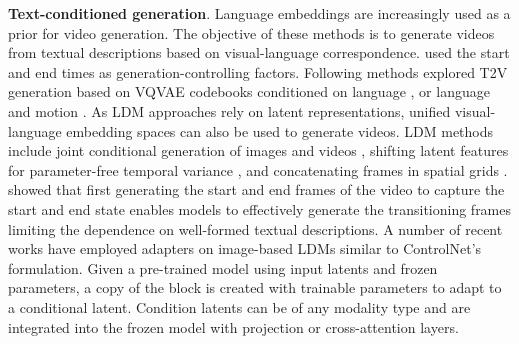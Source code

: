 






\noindent
\textbf{Text-conditioned generation}. Language embeddings are increasingly used as a prior for video generation. The objective of these methods is to generate videos from textual descriptions based on visual-language correspondence. \citet{dorkenwald2021stochastic} used the start and end times as generation-controlling factors. 
Following methods explored T2V generation based on VQVAE codebooks conditioned on language \citep{han2022show,yan2021videogpt}, or language and motion \citep{hu2022make}. As LDM approaches rely on latent representations, unified visual-language embedding spaces can also be used to generate videos. LDM methods include joint conditional generation of images and videos \citep{gupta2023photorealistic}, shifting latent features for parameter-free temporal variance \citep{an2023latent}, and concatenating frames in spatial grids \citep{lee2024grid}. \citet{zeng2024make} showed that
first generating the start and end frames of the video to capture the start and end state enables models to effectively generate the transitioning frames limiting the dependence on well-formed textual descriptions. A number of recent works \citep{fei2024dysen,tian2024videotetris,wang2023videocomposer,wang2024recipe,wei2024dreamvideo,zhuang2024vlogger} have employed adapters on image-based LDMs similar to ControlNet's \citep{zhang2023adding} formulation. Given a pre-trained model using input latents and frozen parameters, a copy of the block is created with trainable parameters to adapt to a conditional latent. Condition latents can be of any modality type and are integrated into the frozen model with projection or cross-attention layers.

